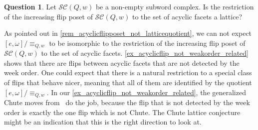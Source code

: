 \documentclass{amsart}
\theoremstyle{definition}
\newtheorem{question}[theorem]{Question}
\newcommand{\subwordComplex}{\mathcal{SC}} %
\begin{document}
\begin{question}
Let $\subwordComplex(Q,w)$ be a non-empty subword complex.
Is the restriction of the increasing flip poset of $\subwordComplex(Q,w)$ to the set of acyclic facets a lattice?    
\end{question}

As pointed out in \cref{rem_acyclicflipposet_not_latticequotient},  we can not expect~$[e,\omega]/\equiv_{Q,w}$ to be isomorphic to the restriction of the increasing flip poset of $\subwordComplex(Q,w)$ to the set of acyclic facets.
\cref{ex_acyclicflip_not_weakorder_related} shows that there are flips between acyclic facets that are not detected by the week order.
One could expect that there is a natural restriction to a special class of flips that behave nicer, meaning that all of them are identified by the quotient~$[e,\omega]/\equiv_{Q,w}$.
In our \cref{ex_acyclicflip_not_weakorder_related}, the generalized Chute moves from~\cite{Rubey} do the job, because the flip that is not detected by the week order is exactly the one flip which is not Chute.
The Chute lattice conjecture~\cite[Conjecture~2.8]{Rubey} might be an indication that this is the right direction to look at.






\label{sec:biblio}

\end{document}
